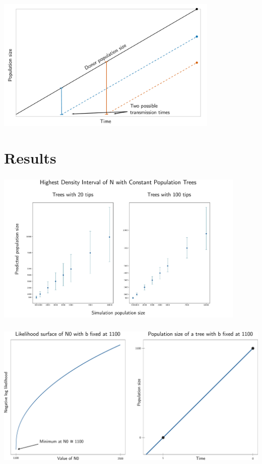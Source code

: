 \documentclass[aspectratio=169]{beamer}
\begin{document}
\begin{frame} \frametitle{\insertsection}

    \centering\includegraphics[width=0.8\textwidth]{images/linear-time-location}

\end{frame}

\section{Results}

\begin{frame} \frametitle{\insertsection}

    \centering\includegraphics[width=0.9\textwidth]{images/constant-agreement}

\end{frame}

\begin{frame} \frametitle{\insertsection}

    \centering\includegraphics[width=\textwidth]{images/linear-progress}

\end{frame}
\end{document}

